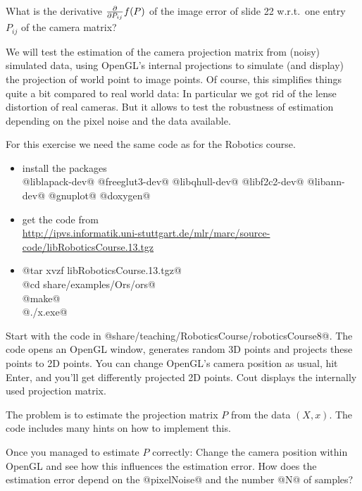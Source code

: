 

\renewcommand{\course}{Robotics}
\renewcommand{\coursepicture}{roboticsLecture}
\renewcommand{\coursedate}{Winter 2014}
\renewcommand{\exnum}{14}

\exercises



What is the derivative $\frac{\partial}{\partial P_{ij}} f(P)$ of the image error
of slide 22 w.r.t.\ one entry $P_{ij}$ of the camera matrix?



We will test the estimation of the camera projection matrix from
(noisy) simulated data, using OpenGL's internal projections to
simulate (and display) the projection of world point to image
points. Of course, this simplifies things quite a bit compared to real
world data: In particular we got rid of the lense distortion of real
cameras. But it allows to test the robustness of estimation
depending on the pixel noise and the data available.

For this exercise we need the same code as for the Robotics course.
\begin{itemize}
\item install the packages \\ {\small @liblapack-dev@ @freeglut3-dev@
@libqhull-dev@ @libf2c2-dev@ @libann-dev@ @gnuplot@ @doxygen@}
\item get the code
from \\ {\small\url{http://ipvs.informatik.uni-stuttgart.de/mlr/marc/source-code/libRoboticsCourse.13.tgz}}
\item {\small
@tar xvzf libRoboticsCourse.13.tgz@\\
@cd share/examples/Ors/ors@\\
@make@\\
@./x.exe@

}
\end{itemize}

Start with the code in @share/teaching/RoboticsCourse/roboticsCourse8@. The
code opens an OpenGL window, generates random 3D points and projects
these points to 2D points. You can change OpenGL's camera position as
usual, hit Enter, and you'll get differently projected 2D points. Cout
displays the internally used projection matrix.

The problem is to estimate the projection matrix $P$ from the data
$(X,x)$. The code includes many hints on how to implement this.

Once you managed to estimate $P$ correctly: Change the camera position
within OpenGL and see how this influences the estimation error. How
does the estimation error depend on the @pixelNoise@ and the
number @N@ of samples?


\exerfoot
